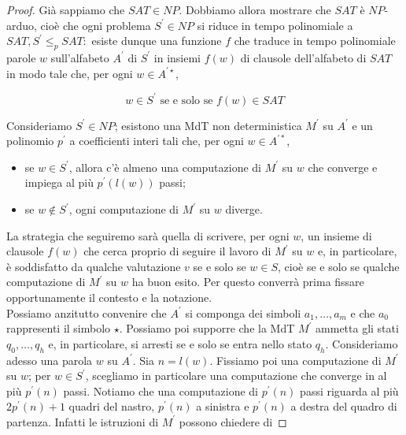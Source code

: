\begin{proof}
    Già sappiamo che $S A T \in N P$. Dobbiamo allora mostrare che $S A T$ è $N
        P$-arduo, cioè che ogni problema $S^{\prime} \in N P$ si riduce in tempo
    polinomiale a $S A T, S^{\prime} \leq_p S A T:$ esiste dunque una
    funzione $f$ che traduce in tempo polinomiale parole $w$ sull'alfabeto
    $A^{\prime}$ di $S^{\prime}$ in insiemi $f(w)$ di clausole dell'alfabeto
    di $S A T$ in modo tale che, per ogni $w \in A^{\prime \star}$,

    $$
        w \in S^{\prime} \text{ se e solo se } f(w) \in S A T
    $$

    Consideriamo $S^{\prime} \in N P$; esistono una MdT non deterministica
    $M^{\prime}$ su $A^{\prime}$ e un polinomio $p^{\prime}$ a coefficienti
    interi tali che, per ogni $w \in A^{\prime *}$,
    \begin{itemize}
        \item se $w \in S^{\prime}$, allora c'è almeno una computazione di
              $M^{\prime}$ su $w$ che converge e impiega al più
              $p^{\prime}(l(w))$ passi;
        \item se $w \notin S^{\prime}$, ogni computazione di $M^{\prime}$ su $w$
              diverge.
    \end{itemize}
    La strategia che seguiremo sarà quella di scrivere, per ogni $w$, un insieme
    di clausole $f(w)$ che cerca proprio di seguire il lavoro di $M^{\prime}$ su
    $w$ e, in particolare, è soddisfatto da qualche valutazione $v$ se e solo se
    $w \in S$, cioè se e solo se qualche computazione di $M^{\prime}$ su $w$ ha
    buon esito. Per questo converrà prima fissare opportunamente il contesto e
    la notazione.\\
    Possiamo anzitutto convenire che $A^{\prime}$ si componga dei simboli $a_1,
        \ldots, a_m$ e che $a_0$ rappresenti il simbolo $\star$. Possiamo poi
    supporre che la MdT $M^{\prime}$ ammetta gli stati $q_0, \ldots, q_h$ e,
    in particolare, si arresti se e solo se entra nello stato $q_h$.
    Consideriamo adesso una parola $w$ su $A^{\prime}$. Sia $n=l(w)$.
    Fissiamo poi una computazione di $M^{\prime}$ su $w$; per $w \in
        S^{\prime}$, scegliamo in particolare una computazione che converge in
    al più $p^{\prime}(n)$ passi. Notiamo che una computazione di
    $p^{\prime}(n)$ passi riguarda al più $2 p^{\prime}(n)+1$ quadri del
    nastro, $p^{\prime}(n)$ a sinistra e $p^{\prime}(n)$ a destra del quadro
    di partenza. Infatti le istruzioni di $M^{\prime}$ possono chiedere di

\end{proof}
